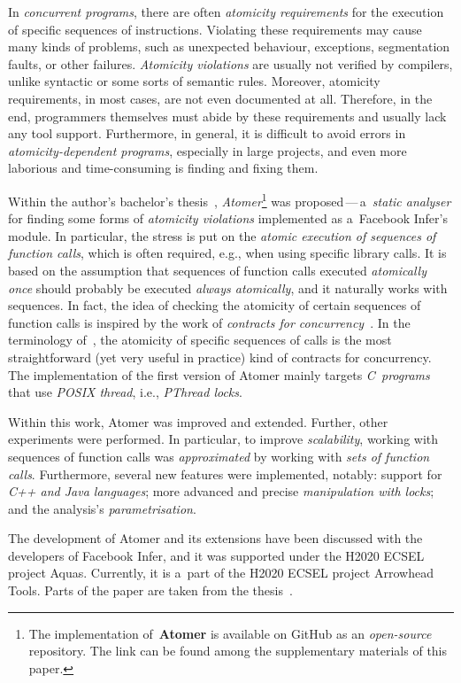 \documentclass{ExcelAtFIT}
\theoremstyle{definition}
\begin{document}
In \emph{concurrent programs}, there are often \emph{atomicity requirements} for the execution of specific sequences of instructions. Violating these requirements may cause many kinds of problems, such as unexpected behaviour, exceptions, segmentation faults, or other failures. \emph{Atomicity violations} are usually not verified by compilers, unlike syntactic or some sorts of semantic rules. Moreover, atomicity requirements, in most cases, are not even documented at all. Therefore, in the end, programmers themselves must abide by these requirements and usually lack any tool support. Furthermore, in general, it is difficult to avoid errors in \emph{atomicity-dependent programs}, especially in large projects, and even more laborious and time-consuming is finding and fixing them.

Within the author's bachelor's thesis~\cite{harmimBP}, \emph{Atomer}\footnote{The implementation of~\textbf{Atomer} is available on GitHub as an \emph{open-source} repository. The link can be found among the supplementary materials of this paper.} was proposed\,---\,a~\emph{static analyser} for finding some forms of \emph{atomicity violations} implemented as a~Facebook Infer's module. In particular, the stress is put on the \emph{atomic execution of sequences of function calls}, which is often required, e.g., when using specific library calls. It is based on the assumption that sequences of function calls executed \emph{atomically once} should probably be executed \emph{always atomically}, and it naturally works with sequences. In fact, the idea of checking the atomicity of certain sequences of function calls is inspired by the work of \emph{contracts for concurrency}~\cite{contracts2017}. In the terminology of~\cite{contracts2017}, the atomicity of specific sequences of calls is the most straightforward (yet very useful in practice) kind of contracts for concurrency. The implementation of the first version of Atomer mainly targets \emph{C~programs} that use \emph{POSIX thread}, i.e., \emph{PThread locks}.

Within this work, Atomer was improved and extended. Further, other experiments were performed. In particular, to improve \emph{scalability}, working with sequences of function calls was \emph{approximated} by working with \emph{sets of function calls}. Furthermore, several new features were implemented, notably: support for \emph{C++ and Java languages}; more advanced and precise \emph{manipulation with locks}; and the analysis's \emph{parametrisation}.

The development of Atomer and its extensions have been discussed with the developers of Facebook Infer, and it was supported under the H2020 ECSEL project Aquas. Currently, it is a~part of the H2020 ECSEL project Arrowhead Tools. Parts of the paper are taken from the thesis~\cite{harmimBP}.
\end{document}
